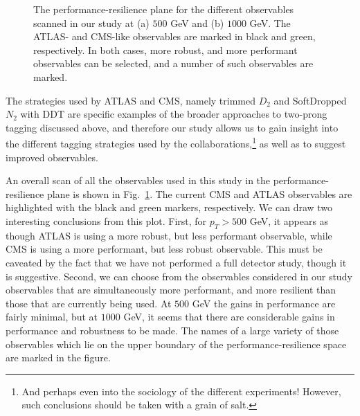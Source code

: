 \begin{figure}
\begin{center}
\qquad
{}
\end{center}
\caption{The performance-resilience plane for the different observables scanned in our study at (a) $500$ GeV and (b) $1000$ GeV. The ATLAS- and CMS-like observables are marked in black and green, respectively. In both cases, more robust, and more performant observables can be selected, and a number of such observables are marked.
}
\label{fig:SM_jetsub_2prong:phasespace}
\end{figure}

The strategies used by ATLAS and CMS, namely trimmed $D_2$ \cite{Larkoski:2015kga,Larkoski:2014gra} and SoftDropped $N_2$ \cite{Moult:2016cvt} with DDT \cite{Dolen:2016kst} are specific examples of the broader approaches to two-prong tagging discussed above, and therefore our study allows us to gain insight into the different tagging strategies used by the collaborations,\footnote{And perhaps even into the sociology of the different experiments! However, such conclusions should be taken with a grain of salt.} as well as to suggest improved observables.

An overall scan of all the observables used in this study in the performance-resilience plane is shown in Fig.~\ref{fig:SM_jetsub_2prong:phasespace}.
%
The current CMS and ATLAS observables are highlighted with the black and green markers, respectively. We can draw two interesting conclusions from this plot.
%
First, for $p_T> 500$ GeV, it appears as though ATLAS is using a more robust, but less performant observable, while CMS is using a more performant, but less robust observable.
%
This must be caveated by the fact that we have not performed a full detector study, though it is suggestive.
%
Second, we can choose from the observables considered in our study observables that are simultaneously more performant, and more resilient than those that are currently being used.
%
At $500$ GeV the gains in performance are fairly minimal, but at $1000$ GeV, it seems that there are considerable gains in performance and robustness to be made.
%
The names of a large variety of those observables which lie on the upper boundary of the performance-resilience space are marked in the figure. 


